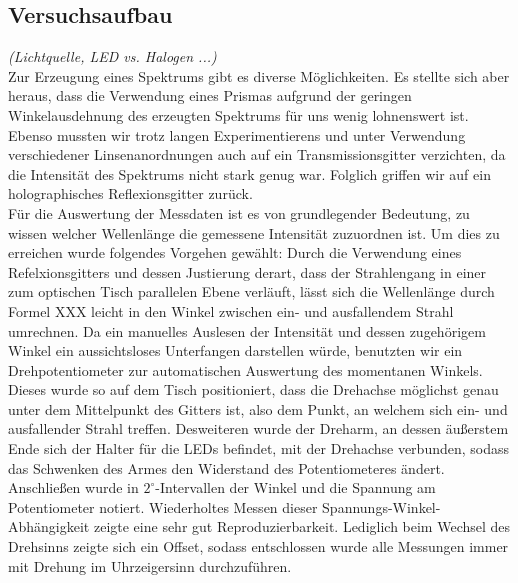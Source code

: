 \documentclass[11pt]{scrartcl}
\begin{document}
\subsection{Versuchsaufbau}
\textit{(Lichtquelle, LED vs. Halogen ...)}\\  %
Zur Erzeugung eines Spektrums gibt es diverse Möglichkeiten. Es stellte sich aber heraus, dass die Verwendung eines Prismas aufgrund der geringen Winkelausdehnung des erzeugten Spektrums für uns wenig lohnenswert ist. Ebenso mussten wir trotz langen Experimentierens und unter Verwendung verschiedener Linsenanordnungen auch auf ein Transmissionsgitter verzichten, da die Intensität des Spektrums nicht stark genug war. Folglich griffen wir auf ein holographisches Reflexionsgitter zurück.\\%
Für die Auswertung der Messdaten ist es von grundlegender Bedeutung, zu wissen welcher Wellenlänge die gemessene Intensität zuzuordnen ist. Um dies zu erreichen wurde folgendes Vorgehen gewählt: Durch die Verwendung eines Refelxionsgitters und dessen Justierung derart, dass der Strahlengang in einer zum optischen Tisch parallelen Ebene verläuft, lässt sich die Wellenlänge durch Formel XXX leicht in den Winkel zwischen ein- und ausfallendem Strahl umrechnen. Da ein manuelles Auslesen der Intensität und dessen zugehörigem Winkel ein aussichtsloses Unterfangen darstellen würde, benutzten wir ein Drehpotentiometer zur automatischen Auswertung des momentanen Winkels. Dieses wurde so auf dem Tisch positioniert, dass die Drehachse möglichst genau unter dem Mittelpunkt des Gitters ist, also dem Punkt, an welchem sich ein- und ausfallender Strahl treffen. Desweiteren wurde der Dreharm, an dessen äußerstem Ende sich der Halter für die LEDs befindet, mit der Drehachse verbunden, sodass das Schwenken des Armes den Widerstand des Potentiometeres ändert. Anschließen wurde in $2^\circ$-Intervallen der Winkel und die Spannung am Potentiometer notiert. Wiederholtes Messen dieser Spannungs-Winkel-Abhängigkeit zeigte eine sehr gut Reproduzierbarkeit. Lediglich beim Wechsel des Drehsinns zeigte sich ein Offset, sodass entschlossen wurde alle Messungen immer mit Drehung im Uhrzeigersinn durchzuführen.\\
\end{document}
